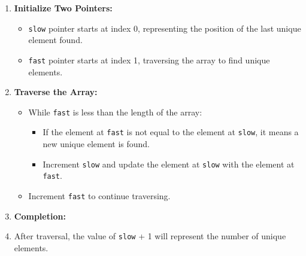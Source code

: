 \begin{enumerate}
    \item \textbf{Initialize Two Pointers:}
        \begin{itemize}
            \item \texttt{slow} pointer starts at index 0, representing the position of the last unique element found.
            \item \texttt{fast} pointer starts at index 1, traversing the array to find unique elements.
        \end{itemize}
    \item \textbf{Traverse the Array:}
        \begin{itemize}
            \item While \texttt{fast} is less than the length of the array:
                \begin{itemize}
                    \item If the element at \texttt{fast} is not equal to the element at \texttt{slow}, it means a new unique element is found.
                    \item Increment \texttt{slow} and update the element at \texttt{slow} with the element at \texttt{fast}.
                \end{itemize}
            \item Increment \texttt{fast} to continue traversing.
        \end{itemize}
    \item \textbf{Completion:}
        \item After traversal, the value of \texttt{slow} + 1 will represent the number of unique elements.
\end{enumerate}

